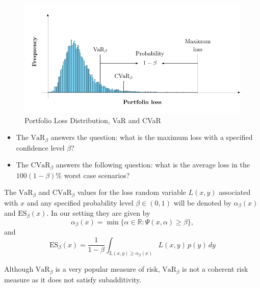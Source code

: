 \begin{figure}[H]
	\centering
	\includegraphics{figures/VarCvar.pdf}
	\caption{Portfolio Loss Distribution, VaR and CVaR}
	\label{fig:VarCvar}
\end{figure}

\begin{remark}\normalfont \hspace{1cm}
	\begin{itemize}
		\item The $\mbox{VaR}_\beta$ answers the question: what is the maximum loss with a specified confidence level $\beta$?
		\item The $\mbox{CVaR}_\beta$ answers the following question: what is the average loss in the $100(1-\beta)$\% worst case scenarios?
	\end{itemize}
\end{remark}

The $\mbox{VaR}_\beta$ and $\mbox{CVaR}_\beta$ values for the loss random variable $L(x,y)$ associated with $x$ and any specified probability level $\beta \in (0,1)$ will be denoted by $\alpha_\beta(x)$ and $\mbox{ES}_\beta(x)$. In our setting they are given by
\begin{equation}\label{eq:var}
	\alpha_\beta(x) = \min\{\alpha\in\mathbb{R} : \Psi(x,\alpha)\geq \beta \},
\end{equation}
and
\begin{equation}\label{eq:cvar}
	\mbox{ES}_\beta(x) = \frac{1}{1-\beta}\int_{L(x,y)\geq \alpha_\beta(x)} L(x,y)\, p(y)\,dy
\end{equation}

Although $\mbox{VaR}_\beta$ is a very popular measure of risk, $\mbox{VaR}_\beta$ is not a coherent risk measure as it does not satisfy subadditivity. 
 














